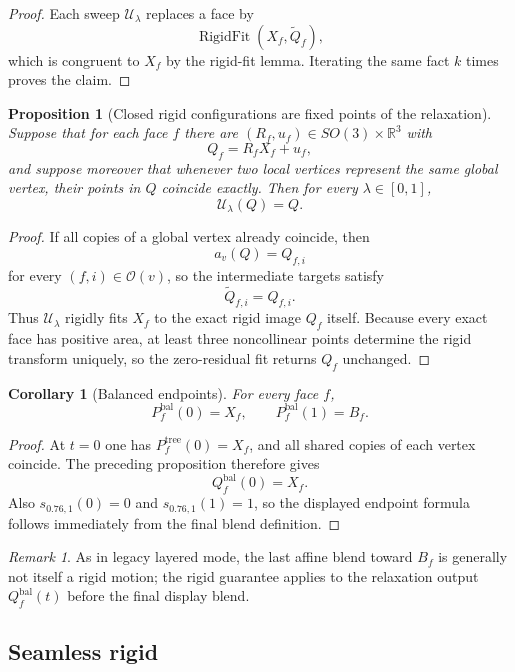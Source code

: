 \documentclass[11pt]{article}
\newtheorem{proposition}[definition]{Proposition}
\newtheorem{corollary}[definition]{Corollary}
\theoremstyle{remark}
\newtheorem{remark}[definition]{Remark}
\newcommand{\RR}{\mathbb{R}}
\begin{document}
\begin{proof}
Each sweep $\mathcal U_\lambda$ replaces a face by
\[
\operatorname{RigidFit}(X_f,\widetilde Q_f),
\]
which is congruent to $X_f$ by the rigid-fit lemma. Iterating the same fact
$k$ times proves the claim.
\end{proof}

\begin{proposition}[Closed rigid configurations are fixed points of the relaxation]
Suppose that for each face $f$ there are $(R_f,u_f)\in SO(3)\times\RR^3$ with
\[
Q_f=R_fX_f+u_f,
\]
and suppose moreover that whenever two local vertices represent the same global
vertex, their points in $Q$ coincide exactly. Then for every
$\lambda\in[0,1]$,
\[
\mathcal U_\lambda(Q)=Q.
\]
\end{proposition}

\begin{proof}
If all copies of a global vertex already coincide, then
\[
a_v(Q)=Q_{f,i}
\]
for every $(f,i)\in\mathcal O(v)$, so the intermediate targets satisfy
\[
\widetilde Q_{f,i}=Q_{f,i}.
\]
Thus $\mathcal U_\lambda$ rigidly fits $X_f$ to the exact rigid image $Q_f$
itself. Because every exact face has positive area, at least three noncollinear
points determine the rigid transform uniquely, so the zero-residual fit returns
$Q_f$ unchanged.
\end{proof}

\begin{corollary}[Balanced endpoints]
For every face $f$,
\[
P_f^{\mathrm{bal}}(0)=X_f,
\qquad
P_f^{\mathrm{bal}}(1)=B_f.
\]
\end{corollary}

\begin{proof}
At $t=0$ one has $P_f^{\mathrm{tree}}(0)=X_f$, and all shared copies of each
vertex coincide. The preceding proposition therefore gives
\[
Q_f^{\mathrm{bal}}(0)=X_f.
\]
Also $s_{0.76,1}(0)=0$ and $s_{0.76,1}(1)=1$, so the displayed endpoint formula
follows immediately from the final blend definition.
\end{proof}

\begin{remark}
As in legacy layered mode, the last affine blend toward $B_f$ is generally not
itself a rigid motion; the rigid guarantee applies to the relaxation output
$Q_f^{\mathrm{bal}}(t)$ before the final display blend.
\end{remark}

\subsection*{Seamless rigid}
\end{document}
